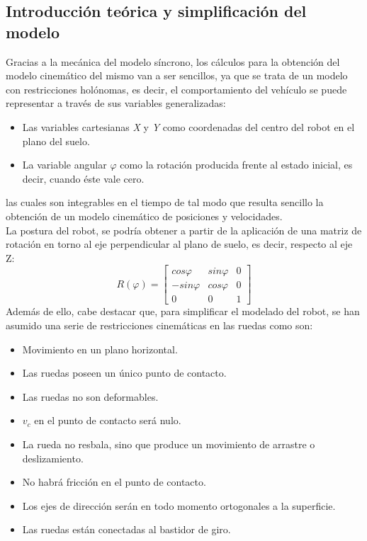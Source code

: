 \documentclass[a4paper,twoside]{article}
\begin{document}
	\subsection{Introducción teórica y simplificación del modelo}
	Gracias a la mecánica del modelo síncrono, los cálculos para la obtención del modelo cinemático del mismo van a ser sencillos, ya que se trata de un modelo con restricciones holónomas, es decir, el comportamiento del vehículo se puede representar a través de sus variables generalizadas:
	\begin{itemize}
		\item Las variables cartesianas \textit{X} y \textit{Y} como coordenadas del centro del robot en el plano del suelo.
		\item La variable angular $\varphi$ como la rotación producida frente al estado inicial, es decir, cuando éste vale cero.
	\end{itemize}
	las cuales son integrables en el tiempo de tal modo que resulta sencillo la obtención de un modelo cinemático de posiciones y velocidades.\\
	La postura del robot, se podría obtener a partir de la aplicación de una matriz de rotación en torno al eje perpendicular al plano de suelo, es decir, respecto al eje Z:
	\begin{equation}
		R(\varphi)=
		\begin{bmatrix}
			cos\varphi & sin\varphi & 0 \\
			-sin\varphi & cos\varphi & 0 \\
			0 & 0 & 1
		\end{bmatrix}
	\end{equation}
	Además de ello, cabe destacar que, para simplificar el modelado del robot, se han asumido una serie de restricciones cinemáticas en las ruedas como son:
	\begin{itemize}
		\item Movimiento en un plano horizontal.
		\item Las ruedas poseen un único punto de contacto.
		\item Las ruedas no son deformables.
		\item $v_c$ en el punto de contacto será nulo.
		\item La rueda no resbala, sino que produce un movimiento de arrastre o deslizamiento.
		\item No habrá fricción en el punto de contacto.
		\item Los ejes de dirección serán en todo momento ortogonales a la superficie.
		\item Las ruedas están conectadas al bastidor de giro.
	\end{itemize}
\newpage
\end{document}
